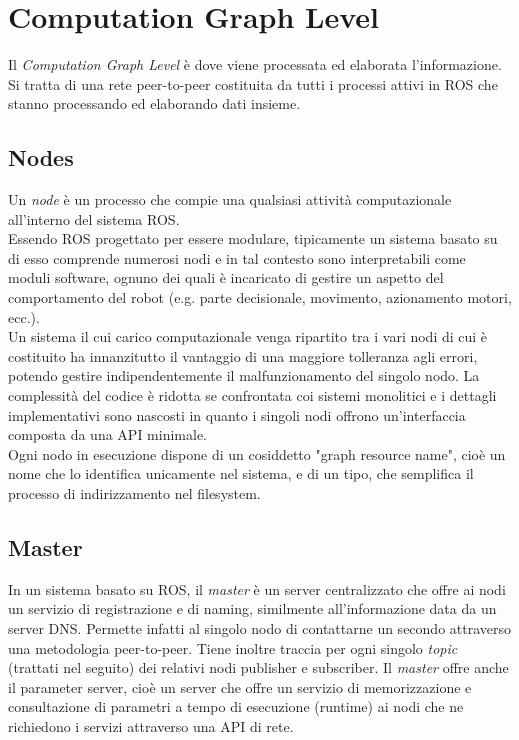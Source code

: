 \section{Computation Graph Level}
Il \emph{Computation Graph Level} è dove viene processata ed elaborata l'informazione. Si tratta di una rete peer-to-peer costituita da tutti i processi attivi in \acs{ROS} che stanno processando ed elaborando dati insieme.

\subsection{Nodes}
Un \emph{node} è un processo che compie una qualsiasi attività computazionale all’interno del sistema \acs{ROS}.\\

Essendo \acs{ROS} progettato per essere modulare, tipicamente un sistema basato su di esso comprende numerosi nodi e in tal contesto sono interpretabili come moduli software, ognuno dei quali è incaricato di gestire un aspetto del comportamento del robot (e.g. parte decisionale, movimento, azionamento motori, ecc.).\\

Un sistema il cui carico computazionale venga ripartito tra i vari nodi di cui è costituito ha innanzitutto il vantaggio di una maggiore tolleranza agli errori, potendo gestire indipendentemente il malfunzionamento del singolo nodo. La complessità del codice è ridotta se confrontata coi sistemi monolitici e i dettagli implementativi sono nascosti in quanto i singoli nodi offrono un’interfaccia composta da una \ac{API} minimale.\\

Ogni nodo in esecuzione dispone di un cosiddetto "graph resource name", cioè un nome che lo identifica unicamente nel sistema, e di un tipo, che semplifica il processo di indirizzamento nel filesystem.

\subsection{Master}
In un sistema basato su ROS, il \emph{master} è un server centralizzato che offre ai nodi un servizio di registrazione e di naming, similmente all’informazione data da un server \ac{DNS}. Permette infatti al singolo nodo di contattarne un secondo attraverso una metodologia peer-to-peer. Tiene inoltre traccia per ogni singolo \emph{topic} (trattati nel seguito) dei relativi nodi publisher e subscriber. Il \emph{master} offre anche il parameter server, cioè un server che offre un servizio di memorizzazione e consultazione di parametri a tempo di esecuzione (runtime) ai nodi che ne richiedono i servizi attraverso una \acs{API} di rete.
 
